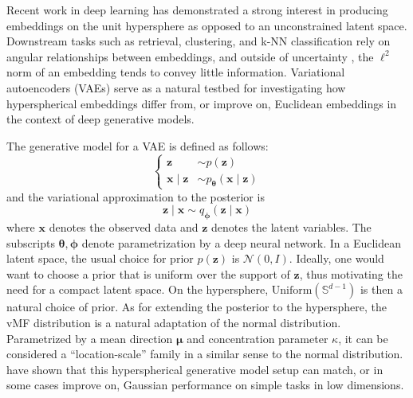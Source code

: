 Recent work in deep learning has demonstrated a strong interest in producing embeddings
on the unit hypersphere as opposed to an unconstrained latent space. Downstream tasks
such as retrieval, clustering, and k-NN classification rely on angular relationships
between embeddings, and outside of uncertainty \citep{levi2025doubleellipsoidgeometryclip},
the $\ell^2$ norm of an embedding tends to convey little information. Variational autoencoders (VAEs) serve as a natural testbed for investigating how hyperspherical
embeddings differ from, or improve on, Euclidean embeddings in the context of deep generative models.

The generative model for a VAE is defined as follows:
\[
    \begin{cases}
        \mathbf{z} &\sim p(\mathbf{z}) \\
        \mathbf{x} \mid \mathbf{z} &\sim p_{\boldsymbol{\theta}}(\mathbf{x} \mid \mathbf{z})
    \end{cases}
\]
and the variational approximation to the posterior is
\[
    \mathbf{z} \mid \mathbf{x} \sim q_{\boldsymbol{\phi}}(\mathbf{z} \mid \mathbf{x})
\]
where $\mathbf{x}$ denotes the observed data and $\mathbf{z}$ denotes the latent variables. The subscripts
$\boldsymbol{\theta}, \boldsymbol{\phi}$ denote parametrization by a deep neural network. In a Euclidean latent
space, the usual choice for prior $p(\mathbf{z})$ is $\mathcal{N}(0, I)$. Ideally, one would want to choose a
prior that is uniform over the support of $\mathbf{z}$, thus motivating the need for a compact latent space. On the
hypersphere, $\text{Uniform}(\mathbb{S}^{d - 1})$ is then a natural choice of prior. As for extending the posterior
to the hypersphere, the vMF distribution is a natural adaptation of the normal distribution. Parametrized by a mean
direction $\boldsymbol{\mu}$ and concentration parameter $\kappa$, it can be considered a ``location-scale'' family
in a similar sense to the normal distribution. \cite{davidson2022hypersphericalvariationalautoencoders} have shown that
this hyperspherical generative model setup can match, or in some cases improve on, Gaussian performance on simple tasks
in low dimensions.

